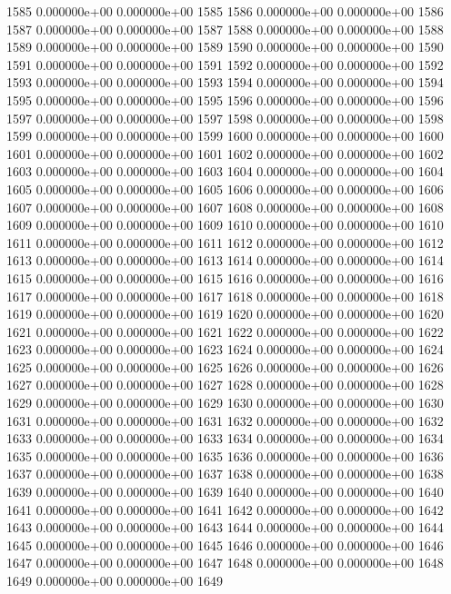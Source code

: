 \documentclass{article}
\begin{document}
\begin{Schunk}
\begin{Soutput}
1585   0.000000e+00   0.000000e+00 1585
1586   0.000000e+00   0.000000e+00 1586
1587   0.000000e+00   0.000000e+00 1587
1588   0.000000e+00   0.000000e+00 1588
1589   0.000000e+00   0.000000e+00 1589
1590   0.000000e+00   0.000000e+00 1590
1591   0.000000e+00   0.000000e+00 1591
1592   0.000000e+00   0.000000e+00 1592
1593   0.000000e+00   0.000000e+00 1593
1594   0.000000e+00   0.000000e+00 1594
1595   0.000000e+00   0.000000e+00 1595
1596   0.000000e+00   0.000000e+00 1596
1597   0.000000e+00   0.000000e+00 1597
1598   0.000000e+00   0.000000e+00 1598
1599   0.000000e+00   0.000000e+00 1599
1600   0.000000e+00   0.000000e+00 1600
1601   0.000000e+00   0.000000e+00 1601
1602   0.000000e+00   0.000000e+00 1602
1603   0.000000e+00   0.000000e+00 1603
1604   0.000000e+00   0.000000e+00 1604
1605   0.000000e+00   0.000000e+00 1605
1606   0.000000e+00   0.000000e+00 1606
1607   0.000000e+00   0.000000e+00 1607
1608   0.000000e+00   0.000000e+00 1608
1609   0.000000e+00   0.000000e+00 1609
1610   0.000000e+00   0.000000e+00 1610
1611   0.000000e+00   0.000000e+00 1611
1612   0.000000e+00   0.000000e+00 1612
1613   0.000000e+00   0.000000e+00 1613
1614   0.000000e+00   0.000000e+00 1614
1615   0.000000e+00   0.000000e+00 1615
1616   0.000000e+00   0.000000e+00 1616
1617   0.000000e+00   0.000000e+00 1617
1618   0.000000e+00   0.000000e+00 1618
1619   0.000000e+00   0.000000e+00 1619
1620   0.000000e+00   0.000000e+00 1620
1621   0.000000e+00   0.000000e+00 1621
1622   0.000000e+00   0.000000e+00 1622
1623   0.000000e+00   0.000000e+00 1623
1624   0.000000e+00   0.000000e+00 1624
1625   0.000000e+00   0.000000e+00 1625
1626   0.000000e+00   0.000000e+00 1626
1627   0.000000e+00   0.000000e+00 1627
1628   0.000000e+00   0.000000e+00 1628
1629   0.000000e+00   0.000000e+00 1629
1630   0.000000e+00   0.000000e+00 1630
1631   0.000000e+00   0.000000e+00 1631
1632   0.000000e+00   0.000000e+00 1632
1633   0.000000e+00   0.000000e+00 1633
1634   0.000000e+00   0.000000e+00 1634
1635   0.000000e+00   0.000000e+00 1635
1636   0.000000e+00   0.000000e+00 1636
1637   0.000000e+00   0.000000e+00 1637
1638   0.000000e+00   0.000000e+00 1638
1639   0.000000e+00   0.000000e+00 1639
1640   0.000000e+00   0.000000e+00 1640
1641   0.000000e+00   0.000000e+00 1641
1642   0.000000e+00   0.000000e+00 1642
1643   0.000000e+00   0.000000e+00 1643
1644   0.000000e+00   0.000000e+00 1644
1645   0.000000e+00   0.000000e+00 1645
1646   0.000000e+00   0.000000e+00 1646
1647   0.000000e+00   0.000000e+00 1647
1648   0.000000e+00   0.000000e+00 1648
1649   0.000000e+00   0.000000e+00 1649

\end{Soutput}
\end{Schunk}
\end{document}
